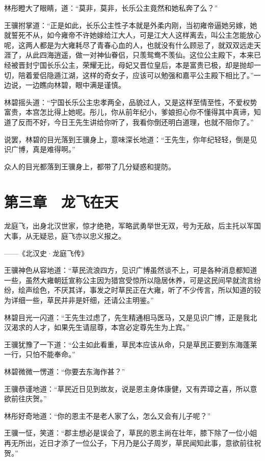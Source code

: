 林彤瞪大了眼睛，道：“莫非，莫非，长乐公主竟然和她私奔了么？”

王骥拊掌道：“正是如此，长乐公主性子本就是外柔内刚，当初雍帝逼她另嫁，她就誓死不从，如今雍帝不许她嫁给江大人，可是江大人这样离去，叫公主怎能放心呢，这两人都是为大雍耗尽了青春心血的人，也就没有什么顾忌了，就双双远走天涯了，从此四海逍遥，做一对神仙眷侣，只羡鸳鸯不羡仙。这位公主殿下，本来已经被晋封宁国长乐公主，荣耀无比，母妃又晋位皇后，本是富贵已极，却是抛却一切，陪着爱侣隐遁江湖，这样的奇女子，应该可以勉强和嘉平公主殿下相比了。”一边说，一边瞧向林碧，眼中满是谨慎。

林碧摇头道：“宁国长乐公主忠孝两全，品貌过人，又是这样至情至性，不爱权势富贵，本宫怎比得上她呢。彤儿，你从前年纪小，爹娘担心你不懂得其中真谛，知道了反而不好，今日王先生讲给你听了，我看你倒还明白道理，也就不阻你了。”

说罢，林碧的目光落到王骥身上，意味深长地道：“王先生，你年纪轻轻，倒是见识广博，真是难得啊。”

众人的目光都落到王骥身上，都带了几分疑惑和提防。

\chapter{第三章　龙飞在天}

龙庭飞，出身北汉世家，惊才绝艳，军略武勇举世无双，号为无敌，后主托以军国大事，从无疑忌，庭飞亦以忠义报之。

——《北汉史·龙庭飞传》

王骥神色从容地道：“草民流浪四方，见识广博虽然谈不上，可是各种消息都知道一些，虽然大雍朝廷宣称公主因为猎宫受惊所以隐居休养，可是这民间早就流言纷纷，绘声绘色，不厌其详，事发之时草民正在大雍，听了不少传言，所以知道的较为详细一些，草民并非是奸细，还请公主明鉴。”

林碧目光一闪道：“王先生过虑了，先生精通相马医马，又是见识广博，正是我北汉渴求的人才，如果先生请屈尊，本宫必定尊先生为上宾。”

王骥犹豫了一下道：“公主如此看重，草民本应该从命，只是草民正要到东海蓬莱一行，只怕不能奉命。”

林碧微微一愣道：“你要去东海作甚？”

王骥恭谨地道：“草民近日见到故友，说是恩主身体康健，又有弄璋之喜，所以意欲前往庆贺。”

林彤好奇地道：“你的恩主不是老人家了么，怎么又会有儿子呢？”

王骥一怔，笑道：“郡主想必是误会了，草民的恩主尚在壮年，膝下除了一位小姐再无所出，近日才添了一位公子，下月乃是公子周岁，草民闻知此事，意欲前往祝贺。”

